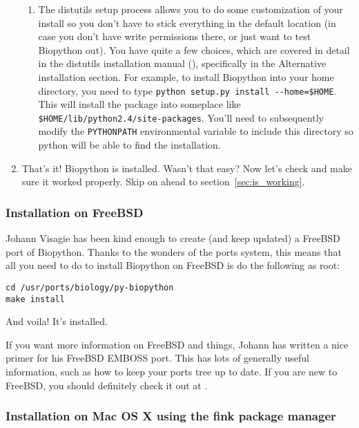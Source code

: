 \documentclass{article}
\begin{document}
\begin{enumerate}
\begin{enumerate}
\item The distutils setup process allows you to do some customization of your install so you don't have to stick everything in the default location (in case you don't have write permissions there, or just want to test Biopython out). You have quite a few choices, which are covered in detail in the distutils installation manual (), specifically in the Alternative installation section. For example, to install Biopython into your home directory, you need to type \verb|python setup.py install --home=$HOME|. This will install the package into someplace like \verb|$HOME/lib/python2.4/site-packages|. You'll need to subsequently modify the \verb|PYTHONPATH| environmental variable to include this directory so python will be able to find the installation.

\end{enumerate}

\item That's it! Biopython is installed. Wasn't that easy? Now let's check and make sure it worked properly. Skip on ahead to section~\ref{sec:is_working}.

\end{enumerate}

\subsubsection{Installation on FreeBSD}

Johann Visagie has been kind enough to create (and keep updated) a FreeBSD port of Biopython. Thanks to the wonders of the ports system, this means that all you need to do to install Biopython on FreeBSD is do the following as root:

\begin{verbatim}
cd /usr/ports/biology/py-biopython
make install
\end{verbatim}

And voila! It's installed. 


If you want more information on FreeBSD and things, Johann has written a nice primer for his FreeBSD EMBOSS port. This has lots of generally useful information, such as how to keep your ports tree up to date. If you are new to FreeBSD, you should definitely check it out at .

\subsubsection{Installation on Mac OS X using the fink package manager}
\end{document}
